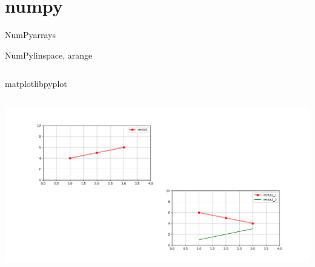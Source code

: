  \section{numpy}
 \begin{frame}{NumPy}{arrays}
       
    \vfill
 \end{frame}
 \begin{frame}{NumPy}{linspace, arange}
    \begin{columns}
       
       
    \end{columns}
    \vfill
 \end{frame}
 \begin{frame}{matplotlib}{pyplot}
    \begin{columns}
       
       \center\includegraphics[width=1.0\textwidth]{python/plot}
    \end{columns}
    \vfill
 \end{frame}

